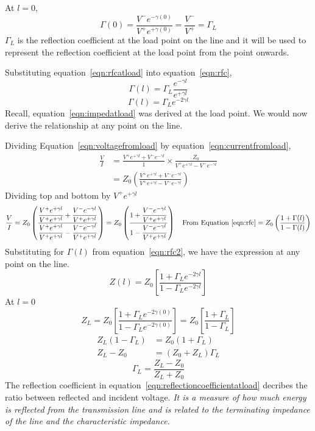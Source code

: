 At $l = 0$,
\begin{dmath}
\Gamma (0) = \frac{V^-e^{-\gamma (0)}}{V^+e^{+\gamma (0)}}
= \frac{V^-}{V^+}
= \Gamma_L
\label{eqn:rfcatload}
\end{dmath}
$\Gamma_L$ is the reflection coefficient at the load point on the line and it will be used to represent the reflection coefficient at the load point from the point onwards.

Substituting equation~\eqref{eqn:rfcatload} into equation~\eqref{eqn:rfc},
\begin{equation*}
\Gamma (l) = \Gamma_L\frac{e^{-\gamma l}}{e^{+\gamma l}}
\end{equation*}
\begin{equation}
\Gamma (l) = \Gamma_L e^{-2\gamma l}
\label{eqn:rfc2}
\end{equation}
Recall, equation~\ref{eqn:impedatload} was derived at the load point. We would now derive the relationship at any point on the line.

Dividing Equation~\eqref{eqn:voltagefromload} by equation~\eqref{eqn:currentfromload},
\begin{align*}
\frac{V}{I} &= \frac{V^+e^{+\gamma l}+V^-e^{-\gamma l}}{1}\times \frac{Z_0}{V^+e^{+\gamma l}-V^-e^{-\gamma l}}\\
&= Z_0\left( \frac{V^+e^{+\gamma l}+V^-e^{-\gamma l}}{V^+e^{+\gamma l}-V^-e^{-\gamma l}}\right) 
\end{align*}
Dividing top and bottom by $V^+e^{+\gamma l}$
\begin{dmath*}
\frac{V}{I} = Z_0\left( \frac{\dfrac{V^+e^{+\gamma l}}{V^+e^{+\gamma l}}+\dfrac{V^-e^{-\gamma l}}{V^+e^{+\gamma l}}}{\dfrac{V^+e^{+\gamma l}}{V^+e^{+\gamma l}}-\dfrac{V^-e^{-\gamma l}}{V^+e^{+\gamma l}}}\right)
= Z_0\left( \frac{1 + \dfrac{V^-e^{-\gamma l}}{V^+e^{+\gamma l}}}{1 - \dfrac{V^-e^{-\gamma l}}{V^+e^{+\gamma l}}}\right)\quad\text{From Equation~\ref{eqn:rfc}}
=Z_0\left( \frac{1+\Gamma (l)}{1 -\Gamma (l)}\right)
\end{dmath*}
Substituting for $\Gamma (l)$ from equation~\eqref{eqn:rfc2}, we have the expression at any point on the line.
\begin{equation}
Z(l) = Z_0\left[ \frac{1 + \Gamma_L e^{-2\gamma l}}{1 - \Gamma_L e^{-2\gamma l}}\right] 
\end{equation}
At $l = 0$ 
\begin{dmath}
Z_L = Z_0\left[ \frac{1 + \Gamma_L e^{-2\gamma (0)}}{1 - \Gamma_L e^{-2\gamma (0)}}\right] 
= Z_0\left[\frac{1 + \Gamma_L}{1 - \Gamma_L}\right] 
\end{dmath}
\begin{align*}
Z_L(1 - \Gamma_L) &= Z_0(1 + \Gamma_L)\\
Z_L - Z_0 &= (Z_0 + Z_L)\Gamma_L
\end{align*}
\begin{equation}
\Gamma_L = \frac{Z_L - Z_0}{Z_L + Z_0}
\label{eqn:reflectioncoefficientatload}
\end{equation}
The reflection coefficient in equation~\eqref{eqn:reflectioncoefficientatload} decribes the ratio between reflected and incident voltage. \emph{It is a measure of how much energy is reflected from the transmission line and is related to the terminating impedance of the line and the characteristic impedance.}

